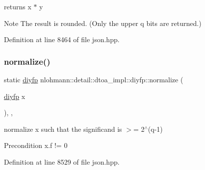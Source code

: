 returns x $\ast$ y 

\begin{DoxyNote}{Note}
The result is rounded. (Only the upper q bits are returned.) 
\end{DoxyNote}


Definition at line 8464 of file json.\+hpp.

\mbox{\label{structnlohmann_1_1detail_1_1dtoa__impl_1_1diyfp_a2246b5b40c7c6992153ef174063d6aa6}} 
\subsubsection{\texorpdfstring{normalize()}{normalize()}}
{\footnotesize\ttfamily static \hyperlink{structnlohmann_1_1detail_1_1dtoa__impl_1_1diyfp}{diyfp} nlohmann\+::detail\+::dtoa\+\_\+impl\+::diyfp\+::normalize (\begin{DoxyParamCaption}\item[{\hyperlink{structnlohmann_1_1detail_1_1dtoa__impl_1_1diyfp}{diyfp}}]{x }\end{DoxyParamCaption})\hspace{0.3cm}{\ttfamily [inline]}, {\ttfamily [static]}, {\ttfamily [noexcept]}}



normalize x such that the significand is $>$= 2$^\wedge$(q-\/1) 

\begin{DoxyPrecond}{Precondition}
x.\+f != 0 
\end{DoxyPrecond}


Definition at line 8529 of file json.\+hpp.

\mbox{\label{structnlohmann_1_1detail_1_1dtoa__impl_1_1diyfp_a6b6665e467ebabe0c0f7418d3fe4b118}} 
